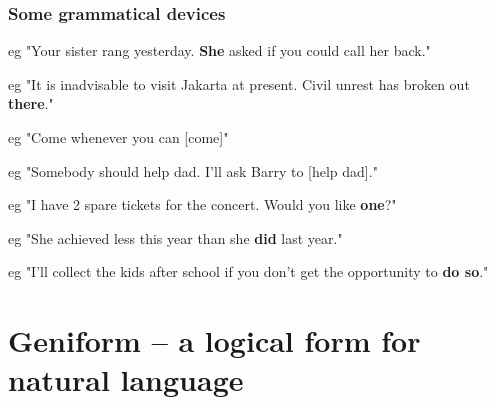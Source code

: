 \subsubsection{Some grammatical devices}


eg "Your sister rang yesterday. \textbf{She} asked if you could call her back."

eg "It is inadvisable to visit Jakarta at present.  Civil unrest has broken out \textbf{there}."


eg "Come whenever you can [come]"

eg "Somebody should help dad.  I'll ask Barry to [help dad]."


eg "I have 2 spare tickets for the concert.  Would you like \textbf{one}?"

eg "She achieved less this year than she \textbf{did} last year."

eg "I'll collect the kids after school if you don't get the opportunity to \textbf{do so}."

\titleformat{\subsection}[hang]{\sffamily\bfseries\large\color{blue}}{\thesubsection \hspace{5pt}}{0pt}{}

\renewcommand{\subsubsection}[1]{\sffamily{\bfseries{\color{blue}{ \stepcounter{subsubsection} #1}}}}

\section{Geniform -- a logical form for natural language}
\label{sec:geniform}


